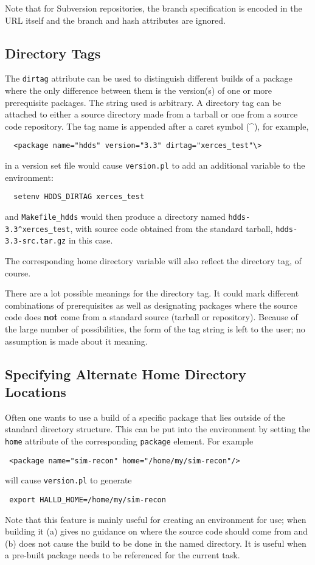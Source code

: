 \documentclass[12pt, letterpaper]{article}
\begin{document}
Note that for Subversion repositories, the branch specification is
encoded in the URL itself and the branch and hash attributes are ignored.

\subsection{Directory Tags}\label{section:directory-tags}

The {\tt dirtag} attribute can be used to distinguish different builds
of a package where the only difference between them is the version(s)
of one or more prerequisite packages. The string used is arbitrary. A
directory tag can be attached to either a source directory made from a
tarball or one from a source code repository. The tag name is appended
after a caret symbol (\^{}), for example,
\begin{verbatim}
  <package name="hdds" version="3.3" dirtag="xerces_test"\>
\end{verbatim}
in a version set file would cause {\tt version.pl} to add an additional
variable to the environment:
\begin{verbatim}
  setenv HDDS_DIRTAG xerces_test
\end{verbatim}
and {\tt Makefile\_hdds} would then produce a directory named
{\tt hdds-3.3\^{}xerces\_test}, with source code obtained from the standard
tarball, {\tt hdds-3.3-src.tar.gz} in this case.

The corresponding home directory variable will also reflect the
directory tag, of course.

There are a lot possible meanings for the directory tag. It could mark
different combinations of prerequisites as well as designating
packages where the source code does {\bf not} come from a standard
source (tarball or repository). Because of the large number of
possibilities, the form of the tag string is left to the user; no
assumption is made about it meaning.

\subsection{Specifying Alternate Home Directory Locations}

Often one wants to use a build of a specific package that lies outside
of the standard directory structure. This can be put into the
environment by setting the {\tt home} attribute of the corresponding
{\tt package} element. For example
\begin{center} \tt
<package name="sim-recon" home="/home/my/sim-recon"/>
\end{center}
will cause {\tt version.pl} to generate
\begin{center} \tt
export HALLD\_HOME=/home/my/sim-recon
\end{center}
Note that this feature is mainly useful for creating an environment
for use; when building it (a) gives no guidance on where the source
code should come from and (b) does not cause the build to be done in
the named directory. It is useful when a pre-built package needs to be
referenced for the current task.
\end{document}
